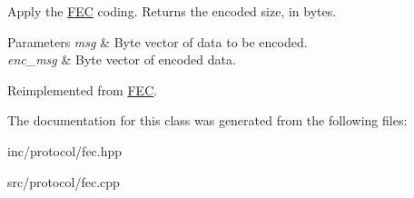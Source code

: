 Apply the \hyperlink{classFEC}{F\+EC} coding. Returns the encoded size, in bytes. 
\begin{DoxyParams}{Parameters}
{\em msg} & Byte vector of data to be encoded. \\
\hline
{\em enc\+\_\+msg} & Byte vector of encoded data. \\
\hline
\end{DoxyParams}


Reimplemented from \hyperlink{classFEC_abc86f45390c50b3cd90cade73a137355}{F\+EC}.



The documentation for this class was generated from the following files\+:\begin{DoxyCompactItemize}
\item 
inc/protocol/fec.\+hpp\item 
src/protocol/fec.\+cpp\end{DoxyCompactItemize}
